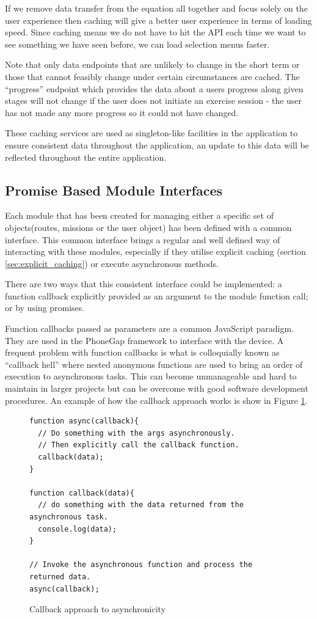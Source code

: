 If we remove data transfer from the equation all together and focus
solely on the user experience then caching will give a better user
experience in terms of loading speed. Since caching means we do not
have to hit the API each time we want to see something we have seen
before, we can load selection menus faster. 

Note that only data endpoints that are unlikely to change in the short
term or those that cannot feasibly change under certain circumstances
are cached. The ``progress'' endpoint which provides the data about a
users progress along given stages will not change if the user does not
initiate an exercise session - the user has not made any more progress
so it could not have changed.

These caching services are used as singleton-like facilities in the
application to ensure consistent data throughout the application, an
update to this data will be reflected throughout the entire
application. 

\subsection{Promise Based Module Interfaces}
Each module that has been created for managing either a specific set
of objects(routes, missions or the user object) has been defined
with a common interface. This common interface brings a regular
and well defined way of interacting with these modules, especially if
they utilise explicit caching (section \ref{sec:explicit_caching}) or
execute asynchronous methods.

There are two ways that this consistent interface could be
implemented: a function callback explicitly provided as an argument to
the module function call; or by using promises.

Function callbacks passed as parameters are a common JavaScript
paradigm. They are used in the PhoneGap framework to interface with
the device\cite{phonegap_currentpos}. A frequent problem with function
callbacks is what is colloquially known as ``callback hell''
\cite{callback_hell} where nested anonymous functions are used to
bring an order of execution to asynchronous tasks. This can become
unmanageable and hard to maintain in larger projects but can be
overcome with good software development procedures. An example of how
the callback approach works is show in Figure \ref{fig:callbacks}.

\begin{figure}[h]
\begin{verbatim}
function async(callback){
  // Do something with the args asynchronously.
  // Then explicitly call the callback function.
  callback(data);
}

function callback(data){
  // do something with the data returned from the asynchronous task.
  console.log(data);
}

// Invoke the asynchronous function and process the returned data.
async(callback);
\end{verbatim}
\caption{Callback approach to asynchronicity}
\label{fig:callbacks}
\end{figure}

